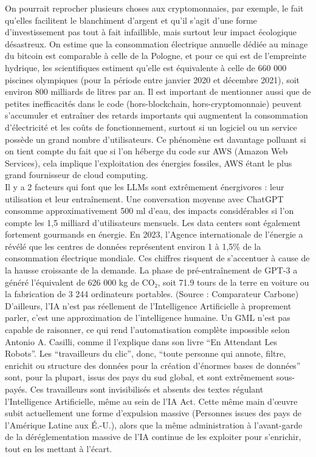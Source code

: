 \documentclass{article}
\begin{document}
On pourrait reprocher plusieurs choses aux cryptomonnaies, par exemple, le fait qu’elles facilitent le blanchiment d’argent et qu’il s’agit d’une forme d’investissement pas tout à fait infaillible, mais surtout leur impact écologique désastreux. On estime que la consommation électrique annuelle dédiée au minage du bitcoin est comparable à celle de la Pologne, et pour ce qui est de l’empreinte hydrique, les scientifiques estiment qu'elle est équivalente à celle de 660 000 piscines olympiques (pour la période entre janvier 2020 et décembre 2021), soit environ 800 milliards de litres par an. Il est important de mentionner aussi que de petites inefficacités dans le code (hors-blockchain, hors-cryptomonnaie) peuvent s’accumuler et entraîner des retards importants qui augmentent la consommation d'électricité et les coûts de fonctionnement, surtout si un logiciel ou un service possède un grand nombre d’utilisateurs. Ce phénomène est davantage polluant si on tient compte du fait que si l’on héberge du code sur AWS (Amazon Web Services), cela implique l’exploitation des énergies fossiles, AWS étant le plus grand fournisseur de cloud computing.\\

Il y a 2 facteurs qui font que les LLMs sont extrêmement énergivores : leur utilisation et leur entraînement. Une conversation moyenne avec ChatGPT consomme approximativement 500 ml d’eau, des impacts considérables si l’on compte les 1,5 milliard d’utilisateurs mensuels. Les data centers sont également fortement gourmands en énergie. En 2023, l’Agence internationale de l’énergie a révélé que les centres de données représentent environ 1 à 1,5\% de la consommation électrique mondiale. Ces chiffres risquent de s'accentuer à cause de la hausse croissante de la demande. La phase de pré-entraînement de GPT-3 a généré l’équivalent de 626 000 kg de CO₂, soit 71.9 tours de la terre en voiture ou la fabrication de 3 244 ordinateurs portables. (Source : Comparateur Carbone)\\

D’ailleurs, l’IA n’est pas réellement de l’Intelligence Artificielle à proprement parler, c’est une approximation de l’intelligence humaine. Un GML n’est pas capable de raisonner, ce qui rend l’automatisation complète impossible selon Antonio A. Casilli, comme il l’explique dans son livre “En Attendant Les Robots”. Les “travailleurs du clic”, donc, “toute personne qui annote, filtre, enrichit ou structure des données pour la création d’énormes bases de données” sont, pour la plupart, issus des pays du sud global, et sont extrêmement sous-payés. Ces travailleurs sont invisibilisés et absents des textes régulant l’Intelligence Artificielle, même au sein de l’IA Act. Cette même main d’œuvre subit actuellement une forme d’expulsion massive (Personnes issues des pays de l’Amérique Latine aux É.-U.), alors que la même administration à l’avant-garde de la déréglementation massive de l’IA continue de les exploiter pour s’enrichir, tout en les mettant à l’écart.\\ 
\end{document}
